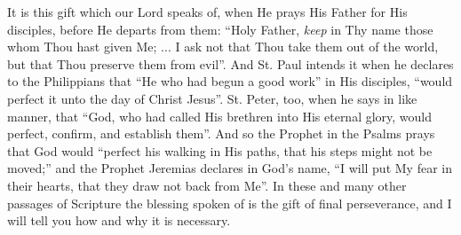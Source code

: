 It is this gift which our Lord speaks of, when He prays His Father
for His disciples, before He departs from them: ``Holy Father, \emph{keep}
in Thy name those whom Thou hast given Me; ... I ask not that Thou
take them out of the world, but that Thou preserve them from
evil''. And St. Paul intends it when he declares to the
Philippians that ``He who had begun a good work'' in His
disciples, ``would perfect it unto the day of Christ Jesus''.
St. Peter, too, when he says in like manner, that ``God, who had
called His brethren into His eternal glory, would perfect, confirm,
and establish them''. And so the Prophet in the Psalms prays that
God would ``perfect his walking in His paths, that his steps might
not be moved;'' and the Prophet Jeremias declares in God's name,
``I will put My fear in their hearts, that they draw not back from
Me''. In these and many other passages of Scripture the blessing
spoken of is the gift of final perseverance, and I will tell you how
and why it is necessary.

